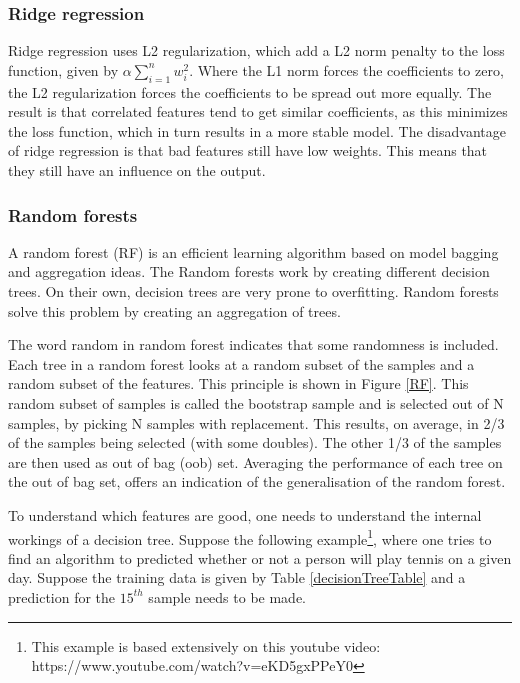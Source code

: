 \subsubsection{Ridge regression}
Ridge regression uses L2 regularization, which add a L2 norm penalty to the loss function, given by $\alpha\sum\limits_{i=1}^{n} w_i^2$. Where the L1 norm forces the coefficients to zero, the L2 regularization forces the coefficients to be spread out more equally. The result is that correlated features tend to get similar coefficients, as this minimizes the loss function, which in turn results in a more stable model. The disadvantage of ridge regression is that bad features still have low weights. This means that they still have an influence on the output.

\subsubsection{Random forests}
A random forest (RF)  is an efficient learning algorithm based on model bagging and aggregation ideas\citep{rfPaper}. The Random forests work by creating different decision trees. On their own, decision trees are very prone to overfitting. Random forests solve this problem by creating an aggregation of trees. 

\npar

The word random in random forest indicates that some randomness is included. Each tree in a random forest looks at a random subset of the samples and a random subset of the features. This principle is shown in Figure \ref{RF}. This random subset of samples is called the bootstrap sample and is selected out of N samples, by picking N samples with replacement. This results, on average, in 2/3 of the samples being selected (with some doubles). The other 1/3 of the samples are then used as out of bag (oob)  set. Averaging the performance of each tree on the out of bag set, offers an indication of the generalisation of the random forest.


To understand which features are good, one needs to understand the internal workings of a decision tree. Suppose the following example\footnote{This example is based extensively on this youtube video: https://www.youtube.com/watch?v=eKD5gxPPeY0}, where one tries to find an algorithm to predicted whether or not a person will play tennis on a given day. Suppose the training data is given by Table \ref{decisionTreeTable} and a prediction for the $15^{th}$ sample needs to be made.


